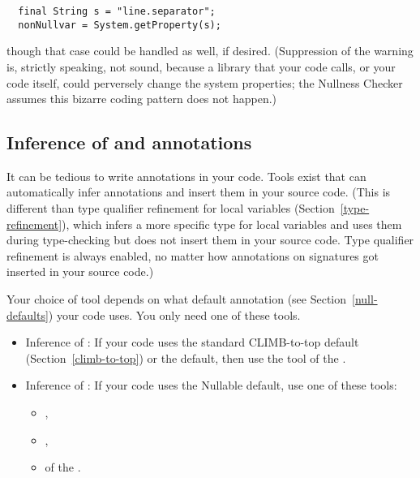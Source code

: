 \begin{Verbatim}
  final String s = "line.separator";
  nonNullvar = System.getProperty(s);
\end{Verbatim}

\noindent
though that case could be handled as well, if desired.
(Suppression of the warning is, strictly speaking, not sound, because a
library that your code calls, or your code itself, could perversely change
the system properties; the Nullness Checker assumes this bizarre coding
pattern does not happen.)


\subsection{Inference of  and  annotations\label{nullness-inference}}

It can be tedious to write annotations in your code.  Tools exist that
can automatically infer annotations and insert them in your source code.
(This is different than type qualifier refinement for local variables
(Section~\ref{type-refinement}), which infers a more specific type for
local variables and uses them during type-checking but does not insert them
in your source code.  Type qualifier refinement is always enabled, no
matter how annotations on signatures got inserted in your source code.)

Your choice of tool depends on what default annotation (see
Section~\ref{null-defaults}) your code uses.  You only need one of these tools.

\begin{itemize}

\item
  Inference of :
  If your code uses the standard CLIMB-to-top default (Section~\ref{climb-to-top}) or
  the  default, then use the
  tool of the .

\item
  Inference of :
  If your code uses the Nullable default, use one of these tools:
\begin{itemize}
\item
  ,
\item
  ,
\item
   of the .
\end{itemize}

\end{itemize}



